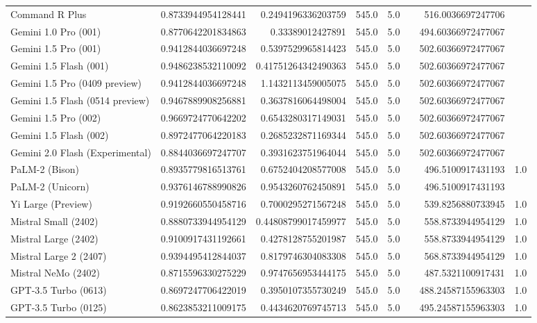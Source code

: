 \begin{table}[htp]
{\begin{tabular}{lrrrrrrr}
Command R Plus & 0.8733944954128441 & 0.2494196336203759 & 545.0 & 5.0 &  & 516.0036697247706 &  \\
Gemini 1.0 Pro (001) & 0.8770642201834863 & 0.33389012427891 & 545.0 & 5.0 &  & 494.60366972477067 &  \\
Gemini 1.5 Pro (001) & 0.9412844036697248 & 0.5397529965814423 & 545.0 & 5.0 &  & 502.60366972477067 &  \\
Gemini 1.5 Flash (001) & 0.9486238532110092 & 0.41751264342490363 & 545.0 & 5.0 &  & 502.60366972477067 &  \\
Gemini 1.5 Pro (0409 preview) & 0.9412844036697248 & 1.1432113459005075 & 545.0 & 5.0 &  & 502.60366972477067 &  \\
Gemini 1.5 Flash (0514 preview) & 0.9467889908256881 & 0.3637816064498004 & 545.0 & 5.0 &  & 502.60366972477067 &  \\
Gemini 1.5 Pro (002) & 0.9669724770642202 & 0.6543280317149031 & 545.0 & 5.0 &  & 502.60366972477067 &  \\
Gemini 1.5 Flash (002) & 0.8972477064220183 & 0.2685232871169344 & 545.0 & 5.0 &  & 502.60366972477067 &  \\
Gemini 2.0 Flash (Experimental) & 0.8844036697247707 & 0.3931623751964044 & 545.0 & 5.0 &  & 502.60366972477067 &  \\
PaLM-2 (Bison) & 0.8935779816513761 & 0.6752404208577008 & 545.0 & 5.0 &  & 496.5100917431193 & 1.0 \\
PaLM-2 (Unicorn) & 0.9376146788990826 & 0.9543260762450891 & 545.0 & 5.0 &  & 496.5100917431193 &  \\
Yi Large (Preview) & 0.9192660550458716 & 0.7000295271567248 & 545.0 & 5.0 &  & 539.8256880733945 & 1.0 \\
Mistral Small (2402) & 0.8880733944954129 & 0.44808799017459977 & 545.0 & 5.0 &  & 558.8733944954129 & 1.0 \\
Mistral Large (2402) & 0.9100917431192661 & 0.4278128755201987 & 545.0 & 5.0 &  & 558.8733944954129 & 1.0 \\
Mistral Large 2 (2407) & 0.9394495412844037 & 0.8179746304083308 & 545.0 & 5.0 &  & 568.8733944954129 & 1.0 \\
Mistral NeMo (2402) & 0.8715596330275229 & 0.9747656953444175 & 545.0 & 5.0 &  & 487.5321100917431 & 1.0 \\
GPT-3.5 Turbo (0613) & 0.8697247706422019 & 0.3950107355730249 & 545.0 & 5.0 &  & 488.24587155963303 & 1.0 \\
GPT-3.5 Turbo (0125) & 0.8623853211009175 & 0.4434620769745713 & 545.0 & 5.0 &  & 495.24587155963303 & 1.0 \\

\end{tabular}}
\end{table}
